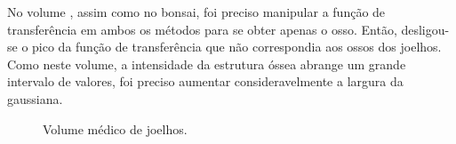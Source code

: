 
	No volume , assim como no bonsai, foi preciso manipular a função de transferência em ambos os métodos para se obter apenas o osso. Então, desligou-se o pico da função de transferência que não correspondia aos ossos dos joelhos. Como neste volume, a intensidade da estrutura óssea abrange um grande intervalo de valores, foi preciso aumentar consideravelmente a largura da gaussiana.

\begin{figure}[h]
	\centering
	\caption{Volume médico de joelhos.}
\end{figure}

